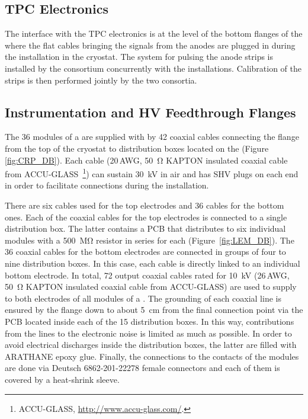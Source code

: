\subsection{TPC Electronics}
\label{sec:fddp-crp-intfc-elec}

The interface with the \dual TPC electronics is at the level of the bottom flanges of the  where the flat cables bringing the signals from the anodes are plugged in during the  installation in the cryostat. The system for %
pulsing the anode strips is installed by the  consortium %
concurrently with the  installations. %
Calibration of the strips is then performed jointly by the two consortia.

\subsection{Instrumentation and HV Feedthrough Flanges}
\label{sec:fddp-crp-intfc-FT}
The \num{36}  modules of a  are supplied with  by \num{42} coaxial cables 
connecting the \fdth flange from the top of the cryostat to distribution boxes located on the  (Figure \ref{fig:CRP_DB}). Each cable (\num{20}\,AWG, \SI{50}{\ohm} KAPTON insulated coaxial cable from ACCU-GLASS~\footnote{ACCU-GLASS\texttrademark{}, \url{http://www.accu-glass.com/}.}) can sustain \SI{30}{kV} in air and has SHV plugs on each end in order to facilitate connections during the  installation.


There are six cables used for the  top electrodes and \num{36} cables for the bottom ones. Each of the coaxial cables for the  top electrodes is connected to a single distribution box. The latter contains a PCB that %
distributes  to six individual  modules with a \SI{500}{\mega\ohm} resistor in series for each 
 (Figure~\ref{fig:LEM_DB}). The \num{36} coaxial cables for the  bottom electrodes are connected in groups of four to nine distribution boxes. In this case, each  cable is directly linked to an individual  bottom electrode. In total, \num{72} output coaxial cables rated for \SI{10}{kV} (\num{26}\,AWG, \SI{50}{\ohm} KAPTON insulated coaxial cable from ACCU-GLASS) are used to supply  to both electrodes of all  modules of a . The grounding of each coaxial line is ensured by the \fdth flange down to about \SI{5}{cm} from the  final connection point via the PCB located inside each of the \num{15} distribution boxes. In this way, contributions from the  lines to the electronic noise is limited as much as possible. In order to avoid electrical discharges inside the distribution boxes, the latter are filled with ARATHANE epoxy glue. Finally, the connections to the  contacts of the  modules are done via  Deutsch 6862-201-22278 female connectors and each of them is covered by a heat-shrink sleeve. 

